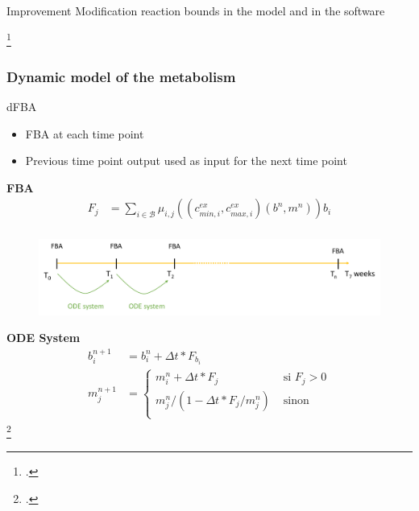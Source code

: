 \documentclass[8pt,usenames,dvipsnames]{beamer}
\begin{document}
\begin{frame}
{\begin{figure}
\end{figure}

\begin{alertblock}{Improvement}
Modification reaction bounds in the model and in the software
\end{alertblock}
}

\footcite{Carroll1999,Swindell1996,Makhlouf2006}

\end{frame}

\begin{frame}
\frametitle{Dynamic model of the metabolism}
\begin{exampleblock}{dFBA}
\begin{itemize}
\item FBA at each time point
\item Previous time point output used as input for the next time point
\end{itemize}
\end{exampleblock}
\textbf{FBA}
\begin{align*}
F_j & =\sum_{i \in \mathcal{B}} {\mu}_{i,j}\left((c^{ex}_{min,i},c^{ex}_{max,i})(b^n,m^n)\right) b_i \\
\end{align*}
\vspace{-1cm}
\begin{figure}[t]
\includegraphics[width=\textwidth]{figures/time-dfba.pdf}
\end{figure}
\vspace{-0.3cm}
\textbf{ODE System}
\begin{align*}
b_i^{n+1}& = b_i^n+\Delta t* F_{b_i} \\
m_j^{n+1}& =\begin{cases} m_i^n+\Delta t* F_{j} & \text{ si } F_j>0 \\ %
m_j^n/(1-\Delta t * F_j/m_j^n) & \text{ sinon} \\ %
\end{cases}
\end{align*}
\footcite{Mahadevan.2002}
\end{frame}
\end{document}
